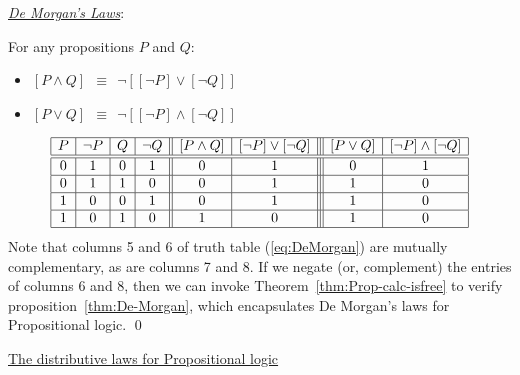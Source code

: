 \bigskip

\noindent 
\underline{\it De Morgan's Laws}:

\begin{prop}
\label{thm:De-Morgan}
For any propositions $P$ and $Q$:
\begin{itemize}
\item
$[ P \wedge Q ] \ \ \equiv \ \ \neg [ [\neg P] \vee [\neg Q]]$
\item
$[ P \vee Q ] \ \ \equiv \ \ \neg [ [\neg P] \wedge [\neg Q]]$
\end{itemize}
\end{prop}

\begin{equation}
\label{eq:DeMorgan}
\begin{array}{|c|c|c|c||c|c|||c|c|}
\hline
P & \neg P & Q & \neg Q 
  & [ P \wedge Q ]
  & [\neg P] \vee [\neg Q]
  & [ P \vee Q ]
  & [\neg P] \wedge [\neg Q] \\
\hline
\hline
0 & 1 & 0 & 1
  & 0
  & 1
  & 0
  & 1 \\
\hline
0 & 1 & 1 & 0
  & 0
  & 1
  & 1
  & 0 \\
\hline
1 & 0 & 0 & 1
  & 0
  & 1
  & 1
  & 0 \\
\hline
1 & 0 & 1 & 0
  & 1
  & 0
  & 1
  & 0 \\
\hline
\end{array}
\end{equation}
Note that columns 5 and 6 of truth table (\ref{eq:DeMorgan}) are
mutually complementary, as are columns 7 and 8.  If we negate (or,
complement) the entries of columns 6 and 8, then we can invoke
Theorem~\ref{thm:Prop-calc-isfree} to verify
proposition~\ref{thm:De-Morgan}, which encapsulates De Morgan's laws
for Propositional logic.  \qed

\medskip

\noindent 
\underline{\small\sf The distributive laws for Propositional logic}


